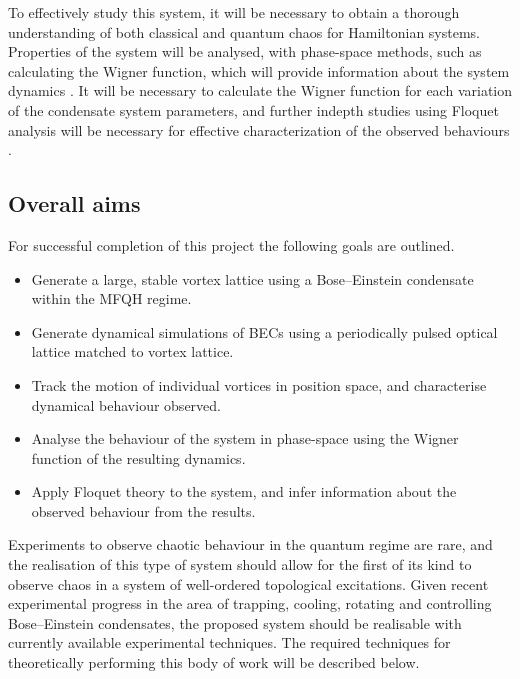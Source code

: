 To effectively study this system, it will be necessary to obtain a thorough understanding of both classical and quantum chaos for 
Hamiltonian systems. Properties of the system will be analysed, with phase-space methods, such as calculating the Wigner function, which will provide information about the system dynamics \cite{CT:Gardiner_pra_2000}. It will be necessary to calculate the Wigner function for each variation of the condensate system parameters, and further indepth studies using Floquet analysis will be necessary for effective characterization of the observed behaviours \cite{CT:chu_physrep_2004,CT:McCaw_thesis_2005,CT:Gardiner_thesis_2000,CT:Kells_pre_2004}.

\subsection{Overall aims}
For successful completion of this project the following goals are outlined.
\begin{itemize}
	\item Generate a large, stable vortex lattice using a Bose--Einstein condensate within the MFQH regime.\vspace{-1em}
	\item Generate dynamical simulations of BECs using a periodically pulsed optical lattice matched to vortex lattice.\vspace{-1em}
	\item Track the motion of individual vortices in position space, and characterise dynamical behaviour observed.\vspace{-1em}
	\item Analyse the behaviour of the system in phase-space using the Wigner function of the resulting dynamics.\vspace{-1em}
	\item Apply Floquet theory to the system, and infer information about the observed behaviour from the results.
\end{itemize}
Experiments to observe chaotic behaviour in the quantum regime are rare, and the realisation of this type of system should allow for the first of its kind to observe chaos in a system of well-ordered topological excitations. Given recent experimental progress in the area of trapping, cooling, rotating and controlling Bose--Einstein condensates, the proposed system should be realisable with currently available experimental techniques.
The required techniques for theoretically performing this body of work will be described below.

